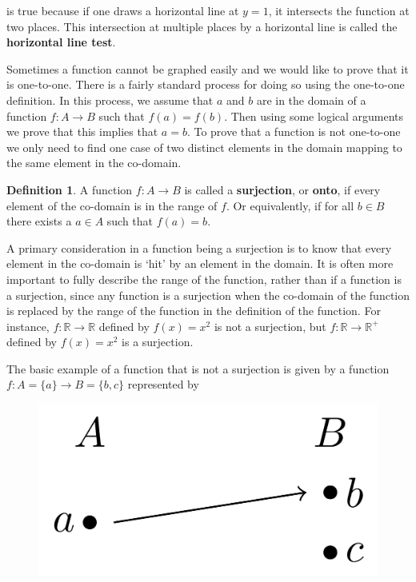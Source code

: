 \documentclass[
]{book}
\theoremstyle{definition}
\newtheorem{definition}{Definition}[chapter]
\theoremstyle{definition}
\theoremstyle{definition}
\theoremstyle{remark}
\begin{document}
is true because if one draws a horizontal line at \(y=1\), it intersects the function at two places. This intersection at multiple places by a horizontal line is called the \textbf{horizontal line test}.

Sometimes a function cannot be graphed easily and we would like to prove that it is one-to-one. There is a fairly standard process for doing so using the one-to-one definition. In this process, we assume that \(a\) and \(b\) are in the domain of a function \(f:A\rightarrow B\) such that \(f(a)=f(b)\). Then using some logical arguments we prove that this implies that \(a=b\). To prove that a function is not one-to-one we only need to find one case of two distinct elements in the domain mapping to the same element in the co-domain.

\begin{definition}
\protect\hypertarget{def:unnamed-chunk-135}{}{\label{def:unnamed-chunk-135} }A function \(f:A\rightarrow B\) is called a \textbf{surjection}, or \textbf{onto}, if every element of the co-domain is in the range of \(f\). Or equivalently, if for all \(b\in B\) there exists a \(a\in A\) such that \(f(a)=b\).
\end{definition}

A primary consideration in a function being a surjection is to know that every element in the co-domain is `hit' by an element in the domain. It is often more important to fully describe the range of the function, rather than if a function is a surjection, since any function is a surjection when the co-domain of the function is replaced by the range of the function in the definition of the function. For instance, \(f:\mathbb{R}\rightarrow \mathbb{R}\) defined by \(f(x)=x^2\) is not a surjection, but \(f:\mathbb{R}\rightarrow \mathbb{R}^+\) defined by \(f(x)=x^2\) is a surjection.

The basic example of a function that is not a surjection is given by a function \(f:A=\{a\} \rightarrow B=\{b,c\}\) represented by

\begin{figure}
 
 {\centering \includegraphics[width=0.3\linewidth]{tikz/example-nonsurjection} 
 
 }
 
 \end{figure}
\end{document}
